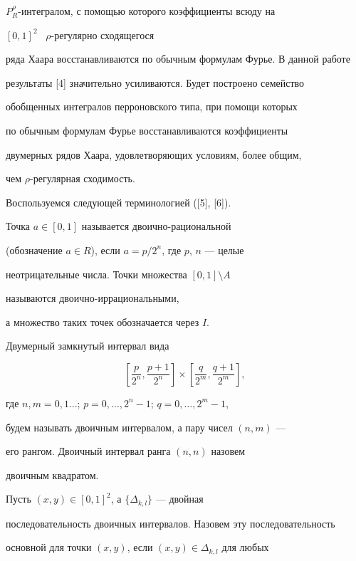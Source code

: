 $P_{R}^{\rho}$-интегралом, с помощью которого коэффициенты всюду на 


$[0,1]^{2}$ \ $\rho$-регулярно сходящегося 


ряда Хаара восстанавливаются по обычным формулам Фурье. В данной работе 


результаты [4] значительно усиливаются. Будет построено семейство 


обобщенных интегралов перроновского типа, при помощи которых 


по обычным формулам Фурье восстанавливаются коэффициенты 


двумерных рядов Хаара, удовлетворяющих условиям, более общим, 


чем $\rho$-регулярная сходимость.





Воспользуемся следующей терминологией ([5], [6]). 


Точка $a\in [0,1]$ называется двоично-рациональной 


(обозначение $a \in R$), если $a=p/2^{n}$, где $p$, $n$ --- целые 


неотрицательные числа. Точки множества $[0,1]\setminus A$ 


называются двоично-иррациональными, 


а множество таких точек обозначается через $I$.





Двумерный замкнутый интервал вида 


$$


\left[ \frac{p}{2^{n}},\frac{p+1}{2^{n}}\right] 


\times \left[ \frac{q}{2^{m}},\frac{q+1}{2^{m}}\right],


$$


где $n,m=0,1\dotsc$; $p=0,\dotsc,2^{n}-1$; $q=0,\dotsc,2^{m}-1$,


будем называть двоичным интервалом, а пару чисел $(n,m)$ ---


его рангом. Двоичный интервал ранга $(n,n) $ назовем


двоичным квадратом.





Пусть $(x,y)\in [0,1]^{2}$, а $\{ \Delta _{k,l}\} $ --- двойная 


последовательность двоичных интервалов. Назовем эту последовательность 


основной для точки $(x,y)$, если $(x,y)\in \Delta _{k,l}$ для любых


